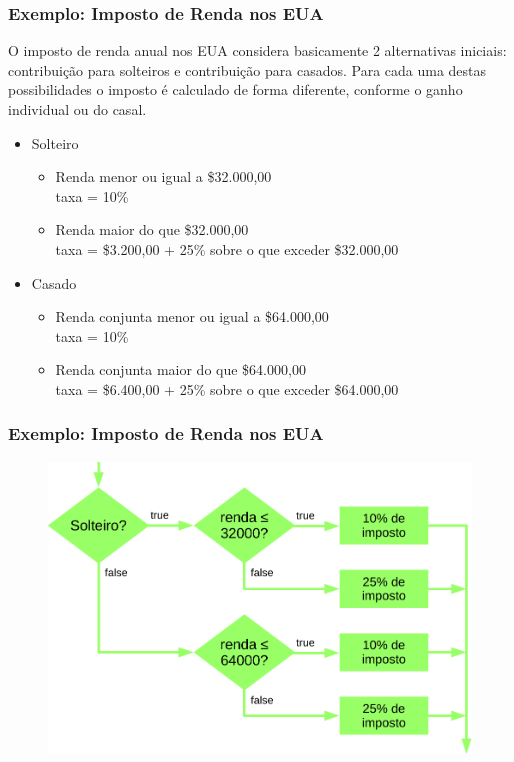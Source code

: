 \documentclass[xcolor={dvipsnames,table},aspectratio=169]{beamer}
\begin{document}
\begin{frame}\frametitle{Exemplo: Imposto de Renda nos EUA}
O imposto de renda anual nos EUA considera basicamente 2 alternativas iniciais: contribuição para solteiros e contribuição para casados.
Para cada uma destas possibilidades o imposto é calculado de forma diferente, conforme o ganho individual ou do casal.
\begin{itemize}
	\item Solteiro
	\begin{itemize}
		\item Renda menor ou igual a \$32.000,00\\
		taxa = 10\%
		\item Renda maior do que \$32.000,00\\
		taxa = \$3.200,00 + 25\% sobre o que exceder \$32.000,00
	\end{itemize}
	\item Casado
	\begin{itemize}
		\item Renda conjunta menor ou igual a \$64.000,00\\
		taxa = 10\%
		\item Renda conjunta maior do que \$64.000,00\\
		taxa = \$6.400,00 + 25\% sobre o que exceder \$64.000,00
	\end{itemize}
\end{itemize}
\end{frame}

\begin{frame}\frametitle{Exemplo: Imposto de Renda nos EUA}
\begin{center}
\begin{figure}[h]
	\includegraphics[height=0.65\paperheight,center]{pucrs-ep-fprog-unidade_03-decisoes-laminas-fluxograma_imposto_eua.png}
\end{figure}
\end{center}
\end{frame}
\end{document}
